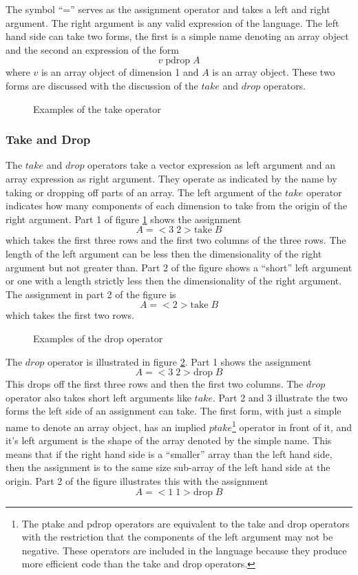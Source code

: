 The symbol ``='' serves as the assignment operator and takes a left and
right argument.  The right argument is any valid expression of the language.
The left hand side can take two forms, the first is a simple name denoting
an array object and the second an expression of the form
$$v\;\mbox{pdrop}\;A$$ where $v$ is an array object of dimension 1 and $A$ is
an array object.  These two forms are discussed with the discussion of the
$take$ and $drop$ operators.

\begin{figure}
\caption{Examples of the take operator}
\label{take}
\end{figure}
\subsubsection{Take and Drop}
The $take$ and $drop$ operators take a vector expression as left argument and
an array expression as right argument.  They operate as indicated
by the name by taking or dropping off parts of an array.  The left argument
of the $take$ operator indicates how many components of each dimension to
take from the origin of the right argument.  Part 1 of figure \ref{take}
shows the assignment
$$A=<3\;2> \mbox{take}\;B$$ which takes the first three rows and the first
two columns of the three rows.  The length of the left argument can be
less then the dimensionality of the right argument but not greater than.  Part
2 of the figure shows a ``short'' left argument or one with a length strictly
less then the dimensionality of the right argument.  The assignment in part 2
of the figure is
$$A=<2> \mbox{take}\;B$$ which takes the first two rows.  

\begin{figure}
\caption{Examples of the drop operator}
\label{drop}
\end{figure}
The $drop$ operator is illustrated in figure \ref{drop}.  Part 1 shows the
assignment
$$A=<3\;2> \mbox{drop}\;B$$
This drops off the first three rows and then the
first two columns.  The $drop$ operator also takes short left arguments like
$take$.  Part 2 and 3 illustrate the two forms the left side of an assignment
can take.  The first form, with just a simple name to denote an array object,
has an implied $ptake$\footnote{The ptake and pdrop operators are equivalent
to the take and drop operators with the restriction that the components of the
left argument may not be negative.  These operators are included in the 
language because they produce more efficient code than the take and drop 
operators.} operator in front of it, and it's left argument is the shape of
the array denoted by the simple name.  This means that if the right hand
side is a ``smaller'' array than the left hand side, then the assignment is
to the same size sub-array of the left hand side at the origin.  Part 2 of 
the figure illustrates this with the assignment
$$A=<1\;1> \mbox{drop}\;B$$

